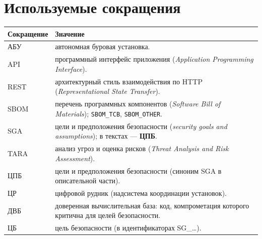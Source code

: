 \chapter*{Используемые сокращения}
\label{ch:abbrev}

\begin{tabularx}{\textwidth}{@{}l X@{}}
\toprule
\textbf{Сокращение} & \textbf{Значение} \\
\midrule
АБУ & автономная буровая установка. \\
API & программный интерфейс приложения (\textit{Application Programming Interface}). \\
REST & архитектурный стиль взаимодействия по HTTP (\textit{Representational State Transfer}). \\
SBOM & перечень программных компонентов (\textit{Software Bill of Materials}); \texttt{SBOM\_TCB}, \texttt{SBOM\_OTHER}. \\
SGA & цели и предположения безопасности (\textit{security goals and assumptions}); в текстах --- \textbf{ЦПБ}. \\
TARA & анализ угроз и оценка рисков (\textit{Threat Analysis and Risk Assessment}). \\
ЦПБ & цели и предположения безопасности (синоним SGA в описательной части). \\
ЦР & цифровой рудник (надсистема координации установок). \\
ДВБ & доверенная вычислительная база: код, компрометация которого критична для целей безопасности. \\
ЦБ & цель безопасности (в идентификаторах SG\_\ldots). \\
\bottomrule
\end{tabularx}
